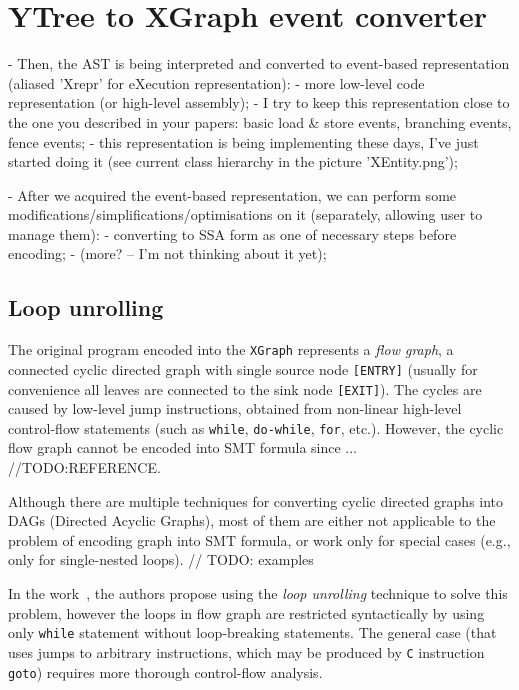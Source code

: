 \section{YTree to XGraph event converter}
\label{section:impl:comp:xgraph}

- Then, the AST is being interpreted and converted to event-based representation (aliased 'Xrepr' for eXecution representation):
        - more low-level code representation (or high-level assembly);
        - I try to keep this representation close to the one you described in your papers: basic load \& store events, branching events, fence events;
        - this representation is being implementing these days, I've just started doing it (see current class hierarchy in the picture 'XEntity.png');
        
- After we acquired the event-based representation, we can perform some modifications/simplifications/optimisations on it (separately, allowing user to manage them):
        - converting to SSA form as one of necessary steps before encoding;
        - (more? -- I'm not thinking about it yet);
        
\subsection{Loop unrolling}
The original program encoded into the \texttt{XGraph} represents a \textit{flow graph}, a connected cyclic directed graph with single source node \texttt{[ENTRY]} (usually for convenience all leaves are connected to the sink node \texttt{[EXIT]}). The cycles are caused by low-level jump instructions, obtained from non-linear high-level control-flow statements (such as \texttt{while}, \texttt{do-while}, \texttt{for}, etc.). However, the cyclic flow graph cannot be encoded into SMT formula since ...
//TODO:REFERENCE.%

Although there are multiple techniques for converting cyclic directed graphs into DAGs (Directed Acyclic Graphs), most of them are either not applicable to the problem of encoding graph into SMT formula, or work only for special cases (e.g., only for single-nested loops).
// TODO: examples%

In the work~\cite{Porthos17}, the authors propose using the \textit{loop unrolling} technique to solve this problem, however the loops in flow graph are restricted syntactically by using only \texttt{while} statement without loop-breaking statements. The general case (that uses jumps to arbitrary instructions, which may be produced by \texttt{C} instruction \texttt{goto}) requires more thorough control-flow analysis.

